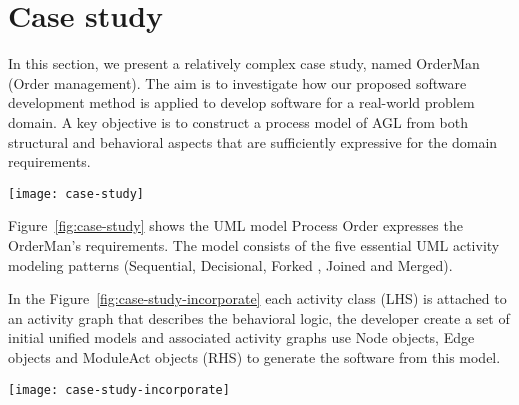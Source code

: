 \section{Case study}
\label{sect:case-study} %

In this section, we present a relatively complex case study, named OrderMan (Order management). The aim is to investigate how our proposed software development method is applied to develop software for a real-world problem domain. A key objective is to construct a process model of AGL from both structural and behavioral aspects that are sufficiently expressive for the domain requirements. 
\begin{figure*}[ht]
	\centering
	\texttt{[image: case-study]}
	\caption{the Process Order} %
	\label{fig:case-study}
\end{figure*}


Figure~\ref{fig:case-study} shows the UML model Process Order expresses the OrderMan’s requirements. The model consists of the five essential UML activity modeling patterns (Sequential, Decisional, Forked , Joined and Merged).


In the Figure~\ref{fig:case-study-incorporate} each activity class (LHS) is attached to an activity graph that describes the behavioral logic, the developer create a set of initial unified models and associated activity graphs use Node objects, Edge objects and ModuleAct objects (RHS) to generate the software from this model.
%
\begin{figure*}[ht]
	\centering
	\texttt{[image: case-study-incorporate]}
	\caption{(LHS) The the unified model; (RHS) The Node objects, Edge objects of the activity graph and ModuleAct objects that are referenced by the Nodes} %
	\label{fig:case-study-incorporate}
\end{figure*}